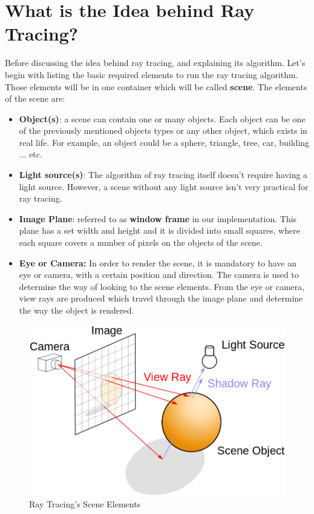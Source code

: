\documentclass[a4paper]{report}
\begin{document}
	\section{What is the Idea behind  Ray Tracing?}
	Before discussing the idea behind ray tracing, and explaining its algorithm. Let's begin with listing the basic required elements to run the ray tracing algorithm. Those elements will be in one container which will be called \textbf{scene}. The elements of the scene are:
	\begin{itemize}
		\item \textbf{Object(s)}: a scene can contain one or many objects. Each object can be one of the previously mentioned objects types or any other object, which exists in real life. For example, an object could be a sphere, triangle, tree, car, building ... etc.
		\item \textbf{Light source(s)}: The algorithm of ray tracing itself doesn't require having a light source. However, a scene without any light source isn't very practical for ray tracing.
		\item \textbf{Image Plane}: referred to as \textbf{window frame} in our implementation. This plane has a set width and height and it is divided into small squares, where each square covers a number of pixels on the objects of the scene.
		\item \textbf{Eye or Camera:} In order to render the scene, it is mandatory to have an eye or camera, with a certain position and direction. The camera is used to determine the way of looking to the scene elements. From the eye or camera, view rays are produced which travel through the image plane and determine the way the object is rendered.
		
	\end{itemize}
	\begin{figure}[ht!]
		\centering
		\includegraphics[scale=0.30]{./raytracing.png}
		\caption{Ray Tracing's Scene Elements \cite{raytracingpic}}
		\label{fig:raytracing}
	\end{figure}
\end{document}
